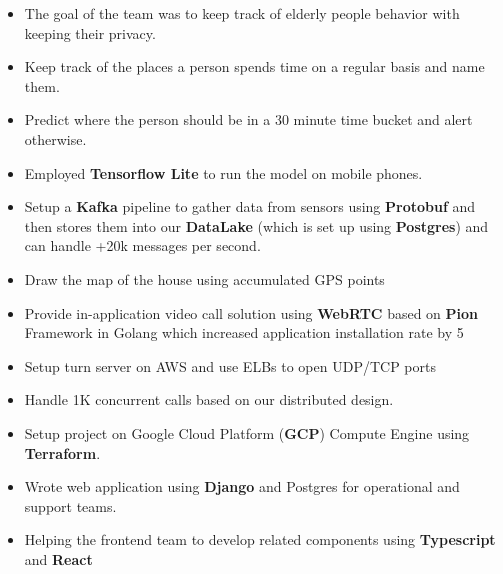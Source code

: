 \vspace{0.5cm}

\begin{itemize}
      \item The goal of the team was to keep track of elderly people behavior with keeping their privacy.
      \item Keep track of the places a person spends time on a regular basis and name them.
      \item Predict where the person should be in a 30 minute time bucket and alert otherwise.
      \item Employed \textbf{Tensorflow Lite} to run the model on mobile phones.
      \item Setup a \textbf{Kafka} pipeline to gather data from sensors using \textbf{Protobuf} and
            then stores them into our \textbf{DataLake} (which is set up using \textbf{Postgres}) and can handle +20k messages per second.
      \item Draw the map of the house using accumulated GPS points
      \item Provide in-application video call solution using \textbf{WebRTC} based on \textbf{Pion} Framework in Golang which increased application installation rate by 5%
      \item Setup turn server on AWS and use ELBs to open UDP/TCP ports
      \item Handle 1K concurrent calls based on our distributed design.
      \item Setup project on Google Cloud Platform (\textbf{GCP}) Compute Engine using \textbf{Terraform}.
      \item Wrote web application using \textbf{Django} and Postgres for operational and support teams.
      \item Helping the frontend team to develop related components using \textbf{Typescript} and \textbf{React}
\end{itemize}
